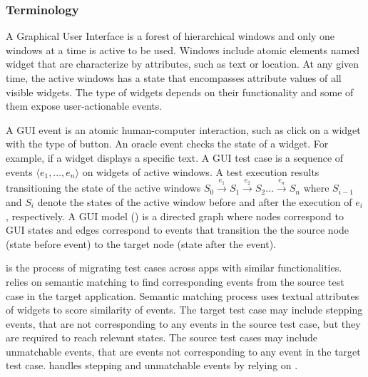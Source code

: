 \subsubsection{Terminology}
A Graphical User Interface is a forest of hierarchical windows and only one windows at a time is active to be used.
Windows include atomic elements named widget that are characterize by attributes, such as text or location.
At any given time, the active windows has a state that encompasses attribute values of all visible widgets.
The type of widgets depends on their functionality and some of them expose user-actionable events.

A GUI event is an atomic human-computer interaction, such as click on a widget with the type of button.
An oracle event checks the state of a widget. 
For example, if a widget displays a specific text. 
A GUI test case is a sequence of events $\langle e_1,..., e_n\rangle$ on widgets of active windows.
A test execution results transitioning the state of the active windows $S_{0} \xrightarrow{e_1} S_1 \xrightarrow{e_2} S_2 \ldots \xrightarrow{e_n} S_{n}$ 
where $S_{i-1}$ and $S_i$ denote the states of the active window before and after the execution of $e_i$, respectively. 
A GUI model (\tam) is a directed graph where nodes correspond to GUI states  and edges correspond to events that transition the the source node (state before event) to the target node (state after the event).

\testreuse is the process of migrating test cases across apps with similar functionalities.
\testreuse relies on semantic matching to find corresponding events from the source test case in the target application.
Semantic matching process uses textual attributes of widgets to score similarity of events.
The target test case may include stepping events, that are not corresponding to any events in the source test case, but they are required to reach relevant states.
The source test cases may include unmatchable events, that are events not corresponding to any event in the target test case. 
\testreuse handles stepping and unmatchable events by relying on \tam.


